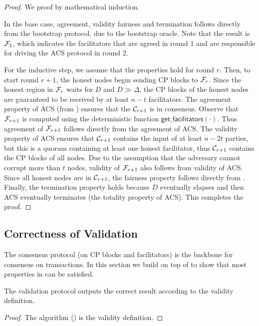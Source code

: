 \begin{proof}
We proof by mathematical induction.

In the base case, agreement, validity fairness and termination follows directly from the bootstrap protocol, due to the bootstrap oracle.
Note that the result is $\mathcal{F}_1$, which indicates the facilitators that are agreed in round 1 and are responsible for driving the ACS protocol in round 2.

For the inductive step, we assume that the properties hold for round $r$.
Then, to start round $r + 1$, the honest nodes begin sending CP blocks to $\mathcal{F}_r$. %
Since the honest region in $\mathcal{F}_r$ waits for $D$ and $D \gg \Delta$,
the CP blocks of the honest nodes are guaranteed to be received by at least $n - t$ facilitators.
The agreement property of ACS (from ) ensures that the $\mathcal{C}_{r + 1}$ is in consensus. 
Observe that $\mathcal{F}_{r + 1}$ is computed using the deterministic function $\textsf{get\_facilitators}(\cdot)$.
Thus agreement of $\mathcal{F}_{r + 1}$ follows directly from the agreement of ACS.
The validity property of ACS ensures that $\mathcal{C}_{r + 1}$ contains the input of at least $n - 2t$ parties, but this is a quorum containing at least one honest facilitator,
thus $\mathcal{C}_{r + 1}$ contains the CP blocks of all nodes.
Due to the assumption that the adversary cannot corrupt more than $t$ nodes,
validity of $\mathcal{F}_{r + 1}$ also follows from validity of ACS.
Since all honest nodes are in $\mathcal{C}_{r + 1}$, the fairness property follows directly from .
Finally, the termination property holds because $D$ eventually elapses and then ACS eventually terminates
(the totality property of ACS).
This completes the proof.
\end{proof}

\subsection{Correctness of Validation}
The consensus protocol (on CP blocks and facilitators) is the backbone for consensus on transactions.
In this section we build on top of  to show that most properties in  can be satisfied.

\begin{lemma}
The validation protocol outputs the correct result
according to the validity definition.
\end{lemma}
\begin{proof}
The algorithm () is the validity definition.
\end{proof}

